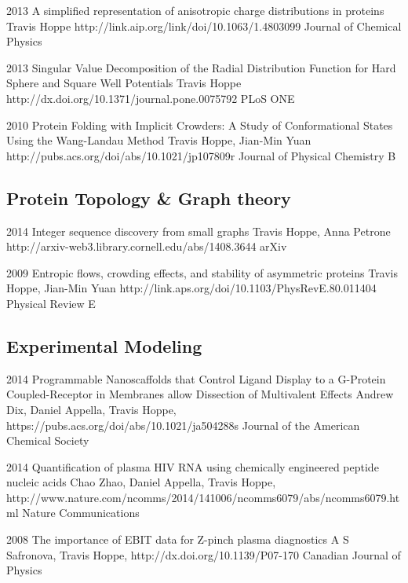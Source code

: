 \documentclass[]{scrartcl}
\begin{document}
\begin{cleanCV}
\Paper
{2013}
{A simplified representation of anisotropic charge distributions in proteins}
{Travis Hoppe}
{http://link.aip.org/link/doi/10.1063/1.4803099}
{Journal of Chemical Physics}

\Paper
{2013}
{Singular Value Decomposition of the Radial Distribution Function 
for Hard Sphere and Square Well Potentials}
{Travis Hoppe}
{http://dx.doi.org/10.1371/journal.pone.0075792}
{PLoS ONE}


\Paper
{2010}
{Protein Folding with Implicit Crowders: 
  A Study of Conformational States Using the Wang-Landau Method}
{Travis Hoppe, Jian-Min Yuan}
{http://pubs.acs.org/doi/abs/10.1021/jp107809r}
{Journal of Physical Chemistry B}


\pagebreak

\subsection{Protein Topology \& Graph theory}

\Paper
{2014}
{Integer sequence discovery from small graphs}
{Travis Hoppe, Anna Petrone}
{http://arxiv-web3.library.cornell.edu/abs/1408.3644}
{arXiv}

\Paper
{2009}
{Entropic flows, crowding effects, and stability of asymmetric proteins}
{Travis Hoppe, Jian-Min Yuan}
{http://link.aps.org/doi/10.1103/PhysRevE.80.011404}
{Physical Review E}


\subsection{Experimental Modeling}

\Paper
{2014}
{Programmable Nanoscaffolds that Control Ligand Display to a G-Protein Coupled-Receptor in Membranes allow Dissection of Multivalent Effects}
{Andrew Dix, Daniel Appella, Travis Hoppe, \etal}
{https://pubs.acs.org/doi/abs/10.1021/ja504288s}
{Journal of the American Chemical Society}

\Paper
{2014}
{Quantification of plasma HIV RNA using chemically engineered peptide nucleic acids}
{Chao Zhao, Daniel Appella, Travis Hoppe, \etal}
{http://www.nature.com/ncomms/2014/141006/ncomms6079/abs/ncomms6079.html}
{Nature Communications}

\Paper
{2008}
{The importance of EBIT data for Z-pinch plasma diagnostics}
{A S Safronova, Travis Hoppe, \etal}
{http://dx.doi.org/10.1139/P07-170}
{Canadian Journal of Physics}


\end{cleanCV}
\end{document}
